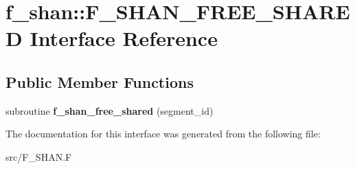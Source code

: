\hypertarget{interfacef__shan_1_1F__SHAN__FREE__SHARED}{}\section{f\+\_\+shan\+:\+:F\+\_\+\+S\+H\+A\+N\+\_\+\+F\+R\+E\+E\+\_\+\+S\+H\+A\+R\+ED Interface Reference}
\label{interfacef__shan_1_1F__SHAN__FREE__SHARED}
\subsection*{Public Member Functions}
\begin{DoxyCompactItemize}
\item 
subroutine {\bfseries f\+\_\+shan\+\_\+free\+\_\+shared} (segment\+\_\+id)\hypertarget{interfacef__shan_1_1F__SHAN__FREE__SHARED_ae1842d0c0062118bf4bc9e8f8b92493d}{}\label{interfacef__shan_1_1F__SHAN__FREE__SHARED_ae1842d0c0062118bf4bc9e8f8b92493d}

\end{DoxyCompactItemize}


The documentation for this interface was generated from the following file\+:\begin{DoxyCompactItemize}
\item 
src/F\+\_\+\+S\+H\+A\+N.\+F\end{DoxyCompactItemize}
